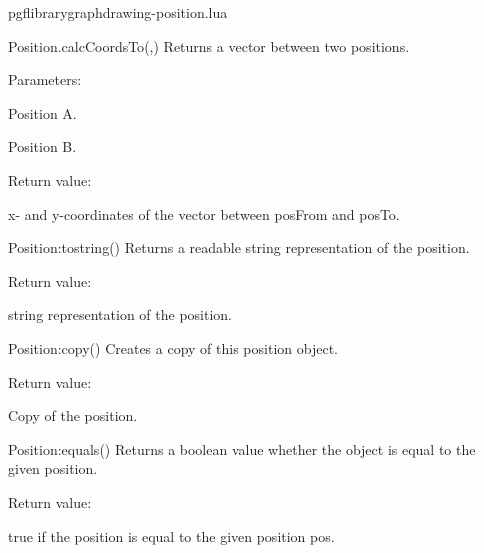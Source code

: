 
\begin{filedescription}{pgflibrarygraphdrawing-position.lua}


\begin{luacommand}{{Position.calcCoordsTo}(,)}
Returns a vector between two positions.

Parameters:
\begin{parameterdescription}
	\item[\meta{posFrom}] Position A.\item[\meta{posTo}] Position B.
\end{parameterdescription}


Return value:
\begin{parameterdescription} 
  \item[] x- and y-coordinates of the vector between posFrom and posTo.
\end{parameterdescription}


\end{luacommand}
\begin{luacommand}{{Position:\textunderscore{}\textunderscore{}tostring}()}
Returns a readable string representation of the position.


Return value:
\begin{parameterdescription} 
  \item[] string representation of the position.
\end{parameterdescription}


\end{luacommand}
\begin{luacommand}{{Position:copy}()}
Creates a copy of this position object.


Return value:
\begin{parameterdescription} 
  \item[] Copy of the position.
\end{parameterdescription}


\end{luacommand}
\begin{luacommand}{{Position:equals}()}
Returns a boolean value whether the object is equal to the given position.


Return value:
\begin{parameterdescription} 
  \item[] true if the position is equal to the given position pos.
\end{parameterdescription}



\end{luacommand}
\end{filedescription}
